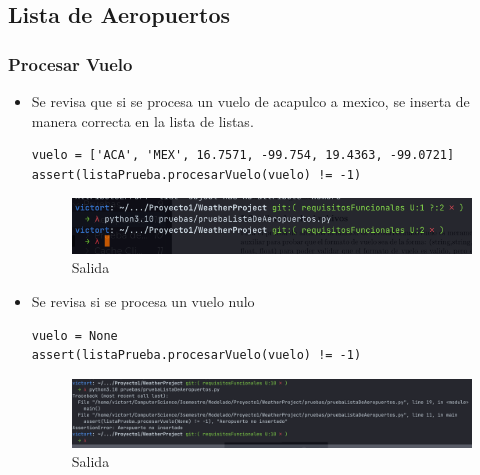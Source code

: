 \documentclass[12pt]{article}
\begin{document}
\subsection{Lista de Aeropuertos}
\subsubsection{Procesar Vuelo}
\begin{itemize}
\item Se revisa que si se procesa un vuelo de acapulco a mexico, se inserta de manera correcta en la lista de listas.
\begin{verbatim}
vuelo = ['ACA', 'MEX', 16.7571, -99.754, 19.4363, -99.0721]
assert(listaPrueba.procesarVuelo(vuelo) != -1)    
\end{verbatim}
\begin{figure}[h!]
    \centering
    \includegraphics[scale=0.7]{pruebasPy/listaAeropuertos/bien.png}
    \caption{Salida}
  \end{figure}
\item Se revisa si se procesa un vuelo nulo
\begin{verbatim}
vuelo = None
assert(listaPrueba.procesarVuelo(vuelo) != -1)    
\end{verbatim}

\begin{figure}[h!]
    \centering
    \includegraphics[scale=0.4]{pruebasPy/listaAeropuertos/procesaNone.png}
    \caption{Salida}
  \end{figure}
\end{itemize}
\end{document}
